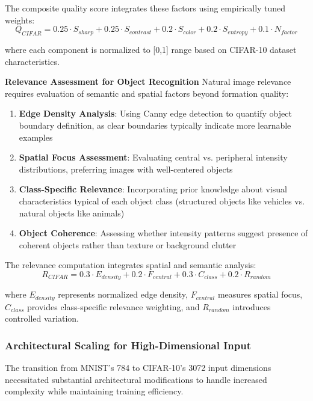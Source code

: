 \documentclass[12pt]{article}
\begin{document}
The composite quality score integrates these factors using empirically tuned weights:
\begin{equation}
Q_{CIFAR} = 0.25 \cdot S_{sharp} + 0.25 \cdot S_{contrast} + 0.2 \cdot S_{color} + 0.2 \cdot S_{entropy} + 0.1 \cdot N_{factor}
\end{equation}

where each component is normalized to [0,1] range based on CIFAR-10 dataset characteristics.

\textbf{Relevance Assessment for Object Recognition}
Natural image relevance requires evaluation of semantic and spatial factors beyond formation quality:

\begin{enumerate}
\item \textbf{Edge Density Analysis}: Using Canny edge detection to quantify object boundary definition, as clear boundaries typically indicate more learnable examples
\item \textbf{Spatial Focus Assessment}: Evaluating central vs. peripheral intensity distributions, preferring images with well-centered objects
\item \textbf{Class-Specific Relevance}: Incorporating prior knowledge about visual characteristics typical of each object class (structured objects like vehicles vs. natural objects like animals)
\item \textbf{Object Coherence}: Assessing whether intensity patterns suggest presence of coherent objects rather than texture or background clutter
\end{enumerate}

The relevance computation integrates spatial and semantic analysis:
\begin{equation}
R_{CIFAR} = 0.3 \cdot E_{density} + 0.2 \cdot F_{central} + 0.3 \cdot C_{class} + 0.2 \cdot R_{random}
\end{equation}

where $E_{density}$ represents normalized edge density, $F_{central}$ measures spatial focus, $C_{class}$ provides class-specific relevance weighting, and $R_{random}$ introduces controlled variation.

\subsubsection{Architectural Scaling for High-Dimensional Input}\label{architecture-scaling}

The transition from MNIST's 784 to CIFAR-10's 3072 input dimensions necessitated substantial architectural modifications to handle increased complexity while maintaining training efficiency.
\end{document}
